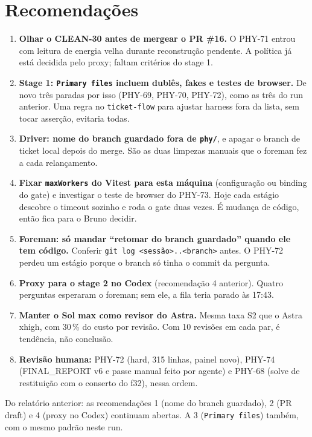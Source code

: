 \documentclass[11pt,a4paper]{article}
\begin{document}
\section{Recomendações}
\begin{enumerate}
  \item \textbf{Olhar o CLEAN-30 antes de mergear o PR \#16.} O PHY-71 entrou
        com leitura de energia velha durante reconstrução pendente. A política
        já está decidida pelo proxy; faltam critérios do stage 1.
  \item \textbf{Stage 1: \texttt{Primary files} incluem dublês, fakes e testes
        de browser.} De novo três paradas por isso (PHY-69, PHY-70, PHY-72),
        como as três do run anterior. Uma regra no \texttt{ticket-flow} para
        ajustar harness fora da lista, sem tocar asserção, evitaria todas.
  \item \textbf{Driver: nome do branch guardado fora de \texttt{phy/}}, e
        apagar o branch de ticket local depois do merge. São as duas
        limpezas manuais que o foreman fez a cada relançamento.
  \item \textbf{Fixar \texttt{maxWorkers} do Vitest para esta máquina}
        (configuração ou binding do gate) e investigar o teste de browser do
        PHY-73. Hoje cada estágio descobre o timeout sozinho e roda o gate duas
        vezes. É mudança de código, então fica para o Bruno decidir.
  \item \textbf{Foreman: só mandar ``retomar do branch guardado'' quando ele tem
        código.} Conferir \texttt{git log <sessão>..<branch>} antes. O PHY-72
        perdeu um estágio porque o branch só tinha o commit da pergunta.
  \item \textbf{Proxy para o stage 2 no Codex} (recomendação 4 anterior).
        Quatro perguntas esperaram o foreman; sem ele, a fila teria parado às
        17:43.
  \item \textbf{Manter o Sol max como revisor do Astra.} Mesma taxa S2 que o
        Astra xhigh, com 30\,\% do custo por revisão. Com 10 revisões em cada
        par, é tendência, não conclusão.
  \item \textbf{Revisão humana:} PHY-72 (hard, 315 linhas, painel novo),
        PHY-74 (FINAL\_REPORT v6 e passe manual feito por agente) e PHY-68
        (solve de restituição com o conserto do f32), nessa ordem.
\end{enumerate}

Do relatório anterior: as recomendações 1 (nome do branch guardado), 2 (PR
draft) e 4 (proxy no Codex) continuam abertas. A 3 (\texttt{Primary files})
também, com o mesmo padrão neste run.
\end{document}
